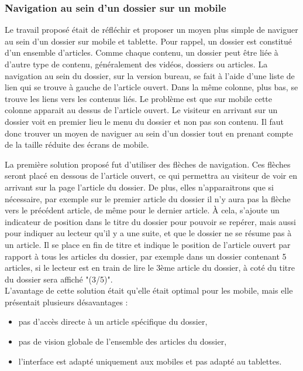 \documentclass[12pt,a4paper]{article}
\begin{document}
\subsubsection{Navigation au sein d'un dossier sur un mobile}
Le travail proposé était de réfléchir et proposer un moyen plus simple de naviguer au sein d'un dossier sur mobile et tablette. Pour rappel, un dossier est constitué d'un ensemble d'articles. Comme chaque contenu, un dossier peut être liée à d'autre type de contenu, généralement des vidéos, dossiers ou articles. La navigation au sein du dossier, sur la version bureau, se fait à l'aide d'une liste de lien qui se trouve à gauche de l'article ouvert. Dans la même colonne, plus bas, se trouve les liens vers les contenus liés. Le problème est que sur mobile cette colonne apparait au dessus de l'article ouvert. Le visiteur en arrivant sur un dossier voit en premier lieu le menu du dossier et non pas son contenu. Il faut donc trouver un moyen de naviguer au sein d'un dossier tout en prenant compte de la taille réduite des écrans de mobile.\par
La première solution proposé fut d'utiliser des flèches de navigation. Ces flèches seront placé en dessous de l'article ouvert, ce qui permettra au visiteur de voir en arrivant sur la page l'article du dossier. De plus, elles n'apparaitrons que si nécessaire, par exemple sur le premier article du dossier il n'y aura pas la flèche vers le précédent article, de même pour le dernier article. À cela, s'ajoute un indicateur de position dans le titre du dossier pour pouvoir se repérer, mais aussi pour indiquer au lecteur qu'il y a une suite, et que le dossier ne se résume pas à un article. Il se place en fin de titre et indique le position de l'article ouvert par rapport à tous les articles du dossier, par exemple dans un dossier contenant 5 articles, si le lecteur est en train de lire le 3ème article du dossier, à coté du titre du dossier sera affiché "(3/5)".\\
L'avantage de cette solution était qu'elle était optimal pour les mobile, mais elle présentait plusieurs désavantages :
\begin{itemize}
\item pas d'accès directe à un article spécifique du dossier,
\item pas de vision globale de l'ensemble des articles du dossier,
\item l'interface est adapté uniquement aux mobiles et pas adapté au tablettes.
\end{itemize}\par
\end{document}
